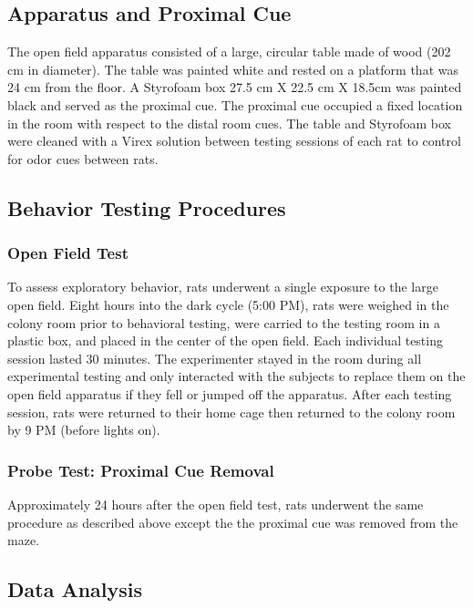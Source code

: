 \documentclass[fleqn,10pt]{wlscirep}
\begin{document}
\subsection*{Apparatus and Proximal Cue}
The open field apparatus consisted of a large, circular table made of wood (202 cm in diameter). The table was painted white and rested on a platform that was 24 cm from the floor. A Styrofoam box 27.5 cm X 22.5 cm X 18.5cm was painted black and served as the proximal cue. The proximal cue occupied a fixed location in the room with respect to the distal room cues. The table and Styrofoam box were cleaned with a Virex solution between testing sessions of each rat to control for odor cues between rats. 

\subsection*{Behavior Testing Procedures}

\subsubsection*{Open Field Test} To assess exploratory behavior, rats underwent a single exposure to the large open field. Eight hours into the dark cycle (5:00 PM), rats were weighed in the colony room prior to behavioral testing, were carried to the testing room in a plastic box, and placed in the center of the open field. Each individual testing session lasted 30 minutes. The experimenter stayed in the room during all experimental testing and only interacted with the subjects to replace them on the open field apparatus if they fell or jumped off the apparatus. After each testing session, rats were returned to their home cage then returned to the colony room by 9 PM (before lights on).

\subsubsection*{Probe Test: Proximal Cue Removal} Approximately 24 hours after the open field test, rats underwent the same procedure as described above except the the proximal cue was removed from the maze.  


\subsection*{Data Analysis}
\end{document}
